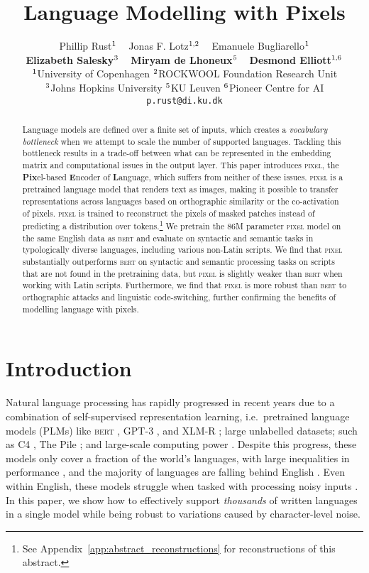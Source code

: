 \documentclass{article}
\title{Language Modelling with Pixels}
\author{Phillip Rust$^{1}$ ~ Jonas F. Lotz$^{1,2}$ ~ Emanuele Bugliarello$^{1}$ \\ \textbf{Elizabeth Salesky}$^{3}$ ~ \textbf{Miryam de Lhoneux}$^{5}$ ~ \textbf{Desmond Elliott}$^{1,6}$\\
  $^{1}$University of Copenhagen \quad
  $^{2}$ROCKWOOL Foundation Research Unit \\
  $^{3}$Johns Hopkins University\quad
  $^{5}$KU Leuven \quad 
  $^{6}$Pioneer Centre for AI\\
\texttt{p.rust@di.ku.dk}
}
\newcommand{\model}{\textsc{pixel}\xspace}
\begin{document}
\maketitle

\begin{abstract}

Language models are defined over a finite set of inputs, which creates a \emph{vocabulary bottleneck} when we attempt to scale the number of supported languages. Tackling this bottleneck results in a trade-off between what can be represented in the embedding matrix and computational issues  in the output layer. This paper introduces \model, the \textbf{Pix}el-based \textbf{E}ncoder of \textbf{L}anguage, which suffers from neither of these issues. \model is a pretrained language model that renders text as images, making it possible to transfer representations across languages based on orthographic similarity or the co-activation of pixels. \model is trained to reconstruct the pixels of masked patches instead of predicting a distribution over tokens.\footnote{See Appendix~\ref{app:abstract_reconstructions} for reconstructions of this abstract.} We pretrain the $86$M parameter \model model on the same English data as \textsc{bert} and evaluate on syntactic and semantic tasks in typologically diverse languages, including various non-Latin scripts.
We find that \model substantially outperforms \textsc{bert} on syntactic and semantic processing tasks on scripts that are not found in the pretraining data, but \model is slightly weaker than \textsc{bert} when working with Latin scripts. 
Furthermore, we find that \model is more robust than \textsc{bert} to orthographic attacks and linguistic code-switching, further confirming the benefits of modelling language with pixels. 


\end{abstract}

\section{Introduction}
\label{sec:intro}
\vspace{-2mm}

Natural language processing has rapidly progressed in recent years due to a combination of self-supervised representation learning, i.e.\ pretrained language models (PLMs) like \textsc{bert} \citep{devlin-etal-2019-bert}, GPT-3 \citep{brown-etal-2020-language}, and XLM-R \citep{conneau-etal-2020-unsupervised}; large unlabelled datasets; such as C4 \citep{raffel-etal-2020-t5}, The Pile \citep{gao2020pile}; and large-scale computing power \citep{hirschberg2015advances}.
Despite this progress, these models only cover a fraction of the world's languages, with large inequalities in performance \citep{pires-etal-2019-multilingual,lauscher-etal-2020-zero},   
and the majority of languages are falling behind English 
\citep{joshi-etal-2020-state,bugliarello-etal-2022-iglue}. Even within English, these models struggle when tasked with processing noisy inputs \citep{SunADV-BERT, eger-benz-2020-hero}.
In this paper, we show how to effectively support \textit{thousands} of written languages in a single model while being robust to variations caused by character-level noise.
\end{document}
